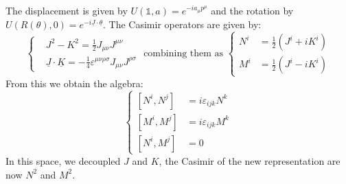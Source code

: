 \documentclass[../main.tex]{subfiles}
\begin{document}
The displacement is given by $U(\mathbb{1},a)=e^{-ia_{\mu}p^{\mu}}$ and the rotation by $U(R(\theta),0)=e^{-i\underline{J}\cdot\underline{\theta}}$. The Casimir operators are given by:
\[
\left\{
\begin{aligned}
&J^2-K^2=\frac{1}{2}J_{\mu\nu}J^{\mu\nu}\\
&\underline{J}\cdot\underline{K}=-\frac{1}{4}\varepsilon^{\mu\nu\rho\sigma}J_{\mu\nu}J^{\rho\sigma}
\end{aligned}
\right.
\text{ combining them as }
\left\{
\begin{aligned}
N^i&=\frac{1}{2}(J^i+iK^i)\\
M^i&=\frac{1}{2}(J^i-iK^i)
\end{aligned}
\right.
\]
From this we obtain the algebra:
\[
\left\{
\begin{aligned}
[N^i,N^j]&=i\varepsilon_{ijk}N^k\\
[M^i,M^j]&=i\varepsilon_{ijk}M^k\\
[N^i,M^j]&=0
\end{aligned}
\right.
\]
In this space, we decoupled $J$ and $K$, the Casimir of the new representation are now $N^2$ and $M^2$.
\end{document}
